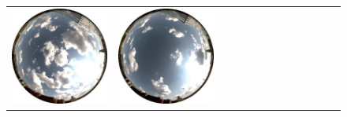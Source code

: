 \documentclass{report}
\begin{document}
\begin{figure}[!th]
\begin{tabular}{@{}rcccccccccccc@{}}
    \includegraphics[width=\customwidth]{./figures/database/20130824_155938.jpg} &
    \includegraphics[width=\customwidth]{./figures/database/20130824_162933.jpg}
    \\

\end{tabular}
\end{figure}
\end{document}
